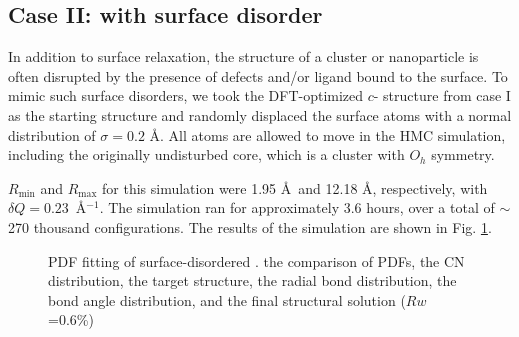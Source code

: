 \subsection{Case II:  with surface disorder}
In addition to surface relaxation, the  structure of a cluster or nanoparticle is often disrupted by the presence of defects and/or ligand bound to the surface.  To mimic such surface disorders, we took the DFT-optimized $c$- structure from case I as the starting structure and randomly displaced the surface atoms with a normal distribution of $\sigma = 0.2$ \AA. All atoms are allowed to move in the HMC simulation, including the originally undisturbed core, which is a  cluster with $O_h$ symmetry.

 $R_\mathrm{min}$ and $R_\mathrm{max}$ for this simulation were 1.95 \AA ~and 12.18 \AA, respectively, with $\delta Q=0.23$~\AA$^{-1}$.
The simulation ran for approximately 3.6 hours, over a total of $\sim$270 thousand configurations.
The results of the simulation are shown in Fig. \ref{fig: Au55 surface}.
\begin{figure}
  \def \localimgpath {./Au_55_DFT_distorted_HMC_paper_final/55d7d4c7d2d355710ddb3fe2}
  \centering
  \captionsetup[subfigure]{labelformat=simple}
    \quad
    \quad
    \quad
    \quad
    \quad
    \quad

  \caption{ PDF fitting of surface-disordered .
  \protect{} the comparison of PDFs,
  \protect{} the CN distribution,
  \protect{} the target structure,
  \protect{} the radial bond distribution,
  \protect{} the bond angle distribution,
  and \protect{} the final structural solution ($Rw$=0.6\%)
  }
	\label{fig: Au55 surface}
\end{figure}

